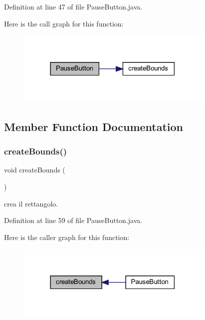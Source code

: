 Definition at line 47 of file Pause\+Button.\+java.

Here is the call graph for this function\+:\nopagebreak
\begin{figure}[H]
\begin{center}
\leavevmode
\includegraphics[width=266pt]{classui_1_1_pause_button_af569d8cce429cf34c8acdbebf5cadfda_cgraph}
\end{center}
\end{figure}


\subsection{Member Function Documentation}
\mbox{\label{classui_1_1_pause_button_ab2aff6fc3e90ebdb1af7d94a4d69d490}} 
\subsubsection{\texorpdfstring{create\+Bounds()}{createBounds()}}
{\footnotesize\ttfamily void create\+Bounds (\begin{DoxyParamCaption}{ }\end{DoxyParamCaption})\hspace{0.3cm}{\ttfamily [private]}}



crea il rettangolo. 



Definition at line 59 of file Pause\+Button.\+java.

Here is the caller graph for this function\+:\nopagebreak
\begin{figure}[H]
\begin{center}
\leavevmode
\includegraphics[width=266pt]{classui_1_1_pause_button_ab2aff6fc3e90ebdb1af7d94a4d69d490_icgraph}
\end{center}
\end{figure}
\mbox{\label{classui_1_1_pause_button_a187945475e730bfa340a10f63224e91f}} 
